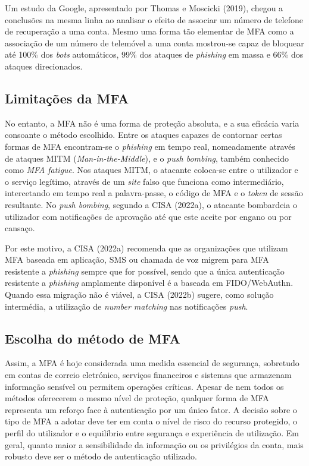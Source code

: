 \hspace{1cm} Um estudo da Google, apresentado por Thomas e Moscicki (2019), chegou a conclusões na mesma linha ao analisar o efeito de associar um número de telefone de recuperação a uma conta. Mesmo uma forma tão elementar de MFA como a associação de um número de telemóvel a uma conta mostrou-se capaz de bloquear até 100\% dos \textit{bots} automáticos, 99\% dos ataques de \textit{phishing} em massa e 66\% dos ataques direcionados.

\subsection{Limitações da MFA}

\hspace{1cm} No entanto, a MFA não é uma forma de proteção absoluta, e a sua eficácia varia consoante o método escolhido. Entre os ataques capazes de contornar certas formas de MFA encontram-se o \textit{phishing} em tempo real, nomeadamente através de ataques MITM (\textit{Man-in-the-Middle}), e o \textit{push bombing}, também conhecido como \textit{MFA fatigue}. Nos ataques MITM, o atacante coloca-se entre o utilizador e o serviço legítimo, através de um \textit{site} falso que funciona como intermediário, intercetando em tempo real a palavra-passe, o código de MFA e o \textit{token} de sessão resultante. No \textit{push bombing}, segundo a CISA (2022a), o atacante bombardeia o utilizador com notificações de aprovação até que este aceite por engano ou por cansaço.

\hspace{1cm} Por este motivo, a CISA (2022a) recomenda que as organizações que utilizam MFA baseada em aplicação, SMS ou chamada de voz migrem para MFA resistente a \textit{phishing} sempre que for possível, sendo que a única autenticação resistente a \textit{phishing} amplamente disponível é a baseada em FIDO/WebAuthn. Quando essa migração não é viável, a CISA (2022b) sugere, como solução intermédia, a utilização de \textit{number matching} nas notificações \textit{push}.

\subsection{Escolha do método de MFA}

\hspace{1cm} Assim, a MFA é hoje considerada uma medida essencial de segurança, sobretudo em contas de correio eletrónico, serviços financeiros e sistemas que armazenam informação sensível ou permitem operações críticas. Apesar de nem todos os métodos oferecerem o mesmo nível de proteção, qualquer forma de MFA representa um reforço face à autenticação por um único fator. A decisão sobre o tipo de MFA a adotar deve ter em conta o nível de risco do recurso protegido, o perfil do utilizador e o equilíbrio entre segurança e experiência de utilização. Em geral, quanto maior a sensibilidade da informação ou os privilégios da conta, mais robusto deve ser o método de autenticação utilizado.


